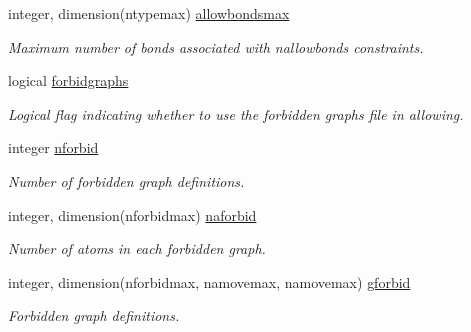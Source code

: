 \begin{DoxyCompactItemize}
\mbox{\label{namespaceglobaldata_a8a8da503ad0fd434e17c540a8955adf8}} 
integer, dimension(ntypemax) \mbox{\hyperlink{namespaceglobaldata_a8a8da503ad0fd434e17c540a8955adf8}{allowbondsmax}}
\begin{DoxyCompactList}\small\item\em Maximum number of bonds associated with nallowbonds constraints. \end{DoxyCompactList}\item 
\mbox{\label{namespaceglobaldata_ad016c6afbb69e3d8c733df8785087875}} 
logical \mbox{\hyperlink{namespaceglobaldata_ad016c6afbb69e3d8c733df8785087875}{forbidgraphs}}
\begin{DoxyCompactList}\small\item\em Logical flag indicating whether to use the forbidden graphs file in allowing. \end{DoxyCompactList}\item 
\mbox{\label{namespaceglobaldata_a6a098b33fc812c47225af9da3e04f30d}} 
integer \mbox{\hyperlink{namespaceglobaldata_a6a098b33fc812c47225af9da3e04f30d}{nforbid}}
\begin{DoxyCompactList}\small\item\em Number of forbidden graph definitions. \end{DoxyCompactList}\item 
\mbox{\label{namespaceglobaldata_a9a68a8dc95d7078b7a9a2f0b40ac2328}} 
integer, dimension(nforbidmax) \mbox{\hyperlink{namespaceglobaldata_a9a68a8dc95d7078b7a9a2f0b40ac2328}{naforbid}}
\begin{DoxyCompactList}\small\item\em Number of atoms in each forbidden graph. \end{DoxyCompactList}\item 
\mbox{\label{namespaceglobaldata_ad00f16842cd39b327807715410187efb}} 
integer, dimension(nforbidmax, namovemax, namovemax) \mbox{\hyperlink{namespaceglobaldata_ad00f16842cd39b327807715410187efb}{gforbid}}
\begin{DoxyCompactList}\small\item\em Forbidden graph definitions. \end{DoxyCompactList}\item 

\end{DoxyCompactItemize}
